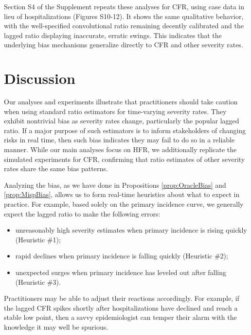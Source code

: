 \documentclass{article}
\renewcommand{\hat}{\widehat} %
\begin{document}
Section S4 of the Supplement repeats these analyses for CFR, using case data in lieu of hospitalizations (Figures S10-12). It shows the same qualitative behavior, with the well-specified convolutional ratio remaining decently calibrated and the lagged ratio displaying inaccurate, erratic swings. This indicates that the underlying bias mechanisms generalize directly to CFR and other severity rates.

\section{Discussion}

Our analyses and experiments illustrate that practitioners should take caution
when using standard ratio estimators for time-varying severity rates. They
exhibit nontrivial bias as severity rates change, particularly the popular
lagged ratio. If a major purpose of such estimators is to inform stakeholders of
changing risks in real time, then such bias indicates they may fail to do so in
a reliable manner.
While our main analyses focus on HFR, we additionally replicate the simulated experiments for CFR, confirming that ratio estimates of other severity rates share the same bias patterns.

Analyzing the bias, as we have done in Propositions \ref{prop:OracleBias} and 
\ref{prop:MispBias}, allows us to form real-time heuristics about what to
expect in practice. For example, based solely on the primary incidence curve, we
generally expect the lagged ratio to make the following errors: 
\begin{itemize}
\item unreasonably high severity estimates when primary incidence is rising
  quickly (Heuristic \#1); 
\item rapid declines when primary incidence is falling quickly (Heuristic \#2); 
\item unexpected surges when primary incidence has leveled out after falling (Heuristic \#3).  
\end{itemize}
Practitioners may be able to adjust their reactions accordingly. For example, if 
the lagged CFR spikes shortly after hospitalizations have declined and reach a
stable low point, then a savvy epidemiologist can temper their alarm with the
knowledge it may well be spurious.  
\end{document}
